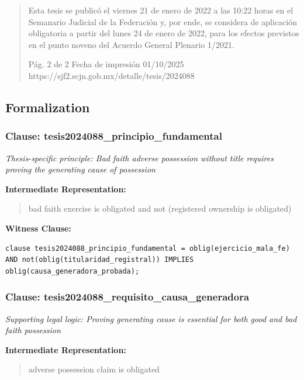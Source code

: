 \documentclass[11pt,a4paper]{article}
\begin{document}
\begin{quote}
Esta tesis se publicó el viernes 21 de enero de 2022 a las 10:22 horas en el Semanario Judicial de
la Federación y, por ende, se considera de aplicación obligatoria a partir del lunes 24 de enero de
2022, para los efectos previstos en el punto noveno del Acuerdo General Plenario 1/2021.




                                             Pág. 2 de 2            Fecha de impresión 01/10/2025
 https://sjf2.scjn.gob.mx/detalle/tesis/2024088

\end{quote}

\subsection{Formalization}

\subsubsection{Clause: tesis2024088\_principio\_fundamental}

\textit{Thesis-specific principle: Bad faith adverse possession without title requires proving the generating cause of possession}

\textbf{Intermediate Representation:}

\begin{quote}
bad faith exercise is obligated and not (registered ownership is obligated)
\end{quote}

\textbf{Witness Clause:}

\begin{lstlisting}[style=witnessstyle, language=Witness]
clause tesis2024088_principio_fundamental = oblig(ejercicio_mala_fe) AND not(oblig(titularidad_registral)) IMPLIES oblig(causa_generadora_probada);
\end{lstlisting}

\subsubsection{Clause: tesis2024088\_requisito\_causa\_generadora}

\textit{Supporting legal logic: Proving generating cause is essential for both good and bad faith possession}

\textbf{Intermediate Representation:}

\begin{quote}
adverse possession claim is obligated
\end{quote}
\end{document}
